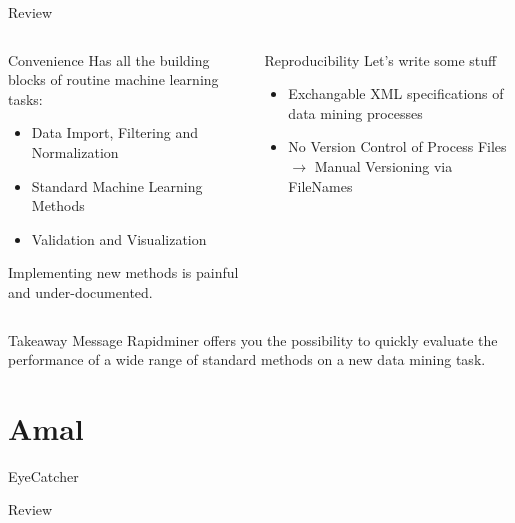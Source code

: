 \documentclass[aspectratio=169,10pt]{beamer}
\begin{document}
\begin{frame}[t,fragile]{Review}

    \begin{columns}[t]
    \begin{column}{0.5\textwidth}
    \begin{block}{Convenience}
        Has all the building blocks of routine machine learning tasks:
        \begin{itemize}
            \item Data Import, Filtering and Normalization
            \item Standard Machine Learning Methods
            \item Validation and Visualization
        \end{itemize}
        Implementing new methods is painful and under-documented.
    \end{block}
    \end{column}
    \begin{column}{0.5\textwidth}
    \begin{block}{Reproducibility}
        Let's write some stuff
        \begin{itemize}
        \item Exchangable XML specifications of data mining processes
        \item No Version Control of Process Files $\rightarrow$ Manual Versioning via FileNames
        \end{itemize}
    \end{block}
    
    \end{column}
    \end{columns}
    \hfill
    \begin{alertblock}{Takeaway Message}
        Rapidminer offers you the possibility to quickly evaluate the performance of a wide range of standard methods on a new data mining task.
    \end{alertblock}
\end{frame}

\section{Amal}
\begin{frame}[fragile]{EyeCatcher}
\end{frame}
\begin{frame}[t,fragile]{Review}
\end{frame}
\end{document}
